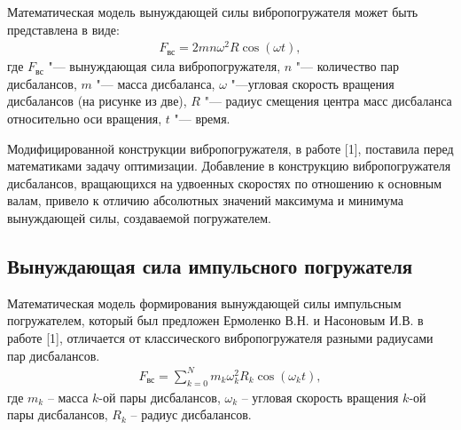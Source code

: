 Математическая модель вынуждающей силы вибропогружателя может быть представлена в виде:
\begin{equation}\label{eq:centrifugal}
    \begin{gathered}
        F_{\textrm{вс}} = 2mn\omega^2 R\cos(\omega t),
    \end{gathered}
\end{equation}
\noindent где $F_{\textrm{вс}}$ "--- вынуждающая сила вибропогружателя, $n$ "--- количество пар дисбалансов, $m$ "--- масса дисбаланса, $\omega$ "---угловая скорость вращения дисбалансов (на рисунке из две),
$R$ "--- радиус смещения центра масс дисбаланса относительно оси вращения, $t$ "--- время.

Модифицированной конструкции вибропогружателя,  в работе [1], поставила перед математиками задачу оптимизации.
Добавление в конструкцию вибропогружателя дисбалансов, вращающихся на удвоенных скоростях по отношению к основным валам, привело к отличию абсолютных
значений максимума и минимума вынуждающей силы, создаваемой погружателем.

\subsection{Вынуждающая сила импульсного погружателя}
Математическая модель формирования вынуждающей силы импульсным погружателем, который был предложен Ермоленко В.Н. и Насоновым И.В. в работе [1], отличается от классического вибропогружателя разными радиусами пар дисбалансов.
\begin{equation}\label{eq:short_harmonic_sum}
    \begin{gathered}
        F_{\textrm{вс}} = \sum\limits_{k = 0}^N m_k \omega_k^2 R_k \cos(\omega_k t),
    \end{gathered}
\end{equation}
\noindent где $m_k$ – масса $k$-ой пары дисбалансов, $\omega_k$ – угловая скорость вращения $k$-ой пары дисбалансов, $R_k$ – радиус дисбалансов.


